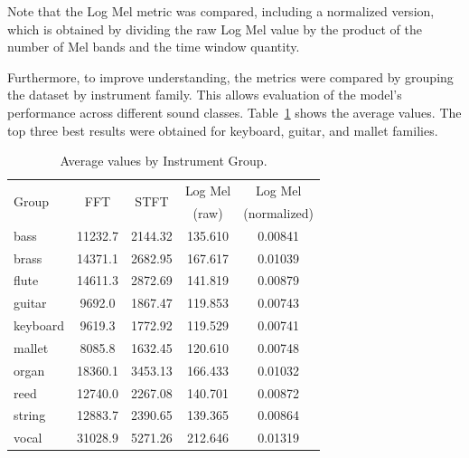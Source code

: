 \documentclass[10pt,conference]{IEEEtran}
\begin{document}
Note that the Log Mel metric was compared, including a normalized version, which is obtained by dividing the raw Log Mel value by the product of the number of Mel bands and the time window quantity.



Furthermore, to improve understanding, the metrics were compared by grouping the dataset by instrument family. This allows evaluation of the model's performance across different sound classes. Table~\ref{tab:avg_metrics_groups} shows the average values.
The top three best results were obtained for keyboard, guitar, and mallet families.



\begin{table}[htb] \small
  \caption{Average values by Instrument Group.}
  \label{tab:avg_metrics_groups}
  \begin{tabular*}{\columnwidth}
	{@{\extracolsep{\fill}}lcccc}
    \toprule
    \multirow{2}{*}{Group} & \multirow{2}{*}{FFT} & \multirow{2}{*}{STFT} & Log Mel& Log Mel \\
    &   &   &   (raw)  & (normalized) \\
    \midrule
    bass     & 11232.7 & 2144.32 & 135.610 & 0.00841 \\
    brass    & 14371.1 & 2682.95 & 167.617 & 0.01039 \\
    flute    & 14611.3 & 2872.69 & 141.819 & 0.00879 \\
    guitar   & 9692.0  & 1867.47 & 119.853 & 0.00743 \\
    keyboard & 9619.3  & 1772.92 & 119.529 & 0.00741 \\
    mallet   & 8085.8  & 1632.45 & 120.610 & 0.00748 \\
    organ    & 18360.1 & 3453.13 & 166.433 & 0.01032 \\
    reed     & 12740.0 & 2267.08 & 140.701 & 0.00872 \\
    string   & 12883.7 & 2390.65 & 139.365 & 0.00864 \\
    vocal    & 31028.9 & 5271.26 & 212.646 & 0.01319 \\
    \bottomrule
  \end{tabular*}
\end{table}
\end{document}
